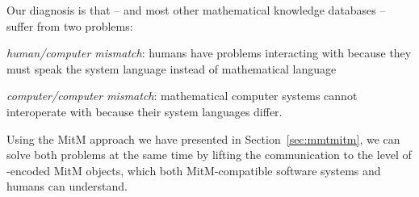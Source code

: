 Our diagnosis is that {\lmfdb} -- and most other mathematical knowledge databases -- suffer from two problems:
\begin{compactitem}
\item \emph{human/computer mismatch}: humans have problems interacting with \lmfdb because they must speak the system language instead of mathematical language
\item \emph{computer/computer mismatch}: mathematical computer systems cannot interoperate with \lmfdb because their system languages differ.
\end{compactitem}
Using the MitM approach we have presented in Section~\ref{sec:mmtmitm}, we can solve both problems at the same time by lifting the communication to the level of \ommt-encoded MitM objects, which both MitM-compatible software systems and humans can understand.

